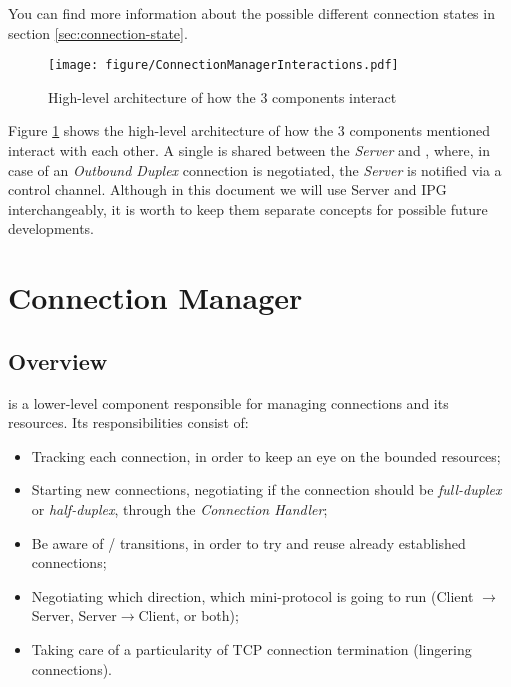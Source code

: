 You can find more information about the possible different connection states in section
\ref{sec:connection-state}.

\begin{figure}
    \centering
    \texttt{[image: figure/ConnectionManagerInteractions.pdf]}
    \caption{High-level architecture of how the 3 components interact}
    \label{fig:high-level-arch}
\end{figure}

Figure \ref{fig:high-level-arch} shows the high-level architecture of how the 3 components mentioned interact
with each other. A single \Connmngr{} is shared between the \emph{Server} and \ptopgov{},
where, in case of an \emph{Outbound Duplex} connection is negotiated, the \emph{Server} is
notified via a control channel. Although in this document we will use Server and IPG
interchangeably, it is worth to keep them separate concepts for possible future
developments.

\section{Connection Manager}

\subsection{Overview}

\Connmngr{} is a lower-level component responsible for managing connections and its
resources. Its responsibilities consist of:

\begin{itemize}
    \item Tracking each connection, in order to keep an eye on the bounded resources;
    \item Starting new connections, negotiating if the connection should be
      \emph{full-duplex} or \emph{half-duplex}, through the \emph{Connection Handler};
    \item Be aware of \warm{}/\hot{} transitions, in order to try and reuse already established
      connections;
    \item Negotiating which direction, which mini-protocol is going to run
      (Client $\rightarrow$ Server, Server$\rightarrow$Client, or both);
    \item Taking care of a particularity of TCP connection termination (lingering
      connections).
\end{itemize}

